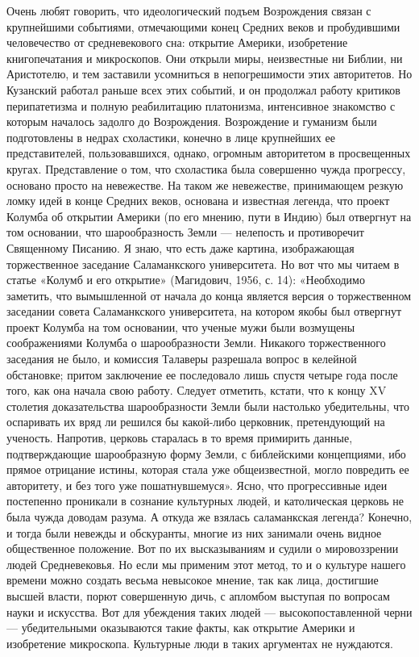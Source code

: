 Очень любят  говорить, что идеологический подъем  Возрождения связан с
крупнейшими событиями, отмечающими конец  Средних веков и пробудившими
человечество  от  средневекового  сна: открытие  Америки,  изобретение
книгопечатания и микроскопов. Они открыли миры, неизвестные ни Библии,
ни  Аристотелю,  и  тем  заставили усомниться  в  непогрешимости  этих
авторитетов.  Но  Кузанский  работал   раньше  всех  этих  событий,  и
он  продолжал  работу  критиков перипатетизма  и  полную  реабилитацию
платонизма,   интенсивное  знакомство   с  которым   началось  задолго
до   Возрождения.  Возрождение   и   гуманизм   были  подготовлены   в
недрах  схоластики,  конечно  в  лице  крупнейших  ее  представителей,
пользовавшихся,  однако, огромным  авторитетом в  просвещенных кругах.
Представление о  том, что схоластика была  совершенно чужда прогрессу,
основано  просто на  невежестве. На  таком же  невежестве, принимающем
резкую ломку идей в конце Средних веков, основана и известная легенда,
что проект Колумба  об открытии Америки (по его мнению,  пути в Индию)
был отвергнут на том основании, что шарообразность Земли --- нелепость
и  противоречит Священному  Писанию. Я  знаю, что  есть даже  картина,
изображающая  торжественное заседание  Саламанкского университета.  Но
вот  что  мы читаем  в  статье  «Колумб  и его  открытие»  (Магидович,
1956,  с. 14):  «Необходимо  заметить, что  вымышленной  от начала  до
конца является  версия о торжественном заседании  совета Саламанкского
университета, на  котором якобы  был отвергнут  проект Колумба  на том
основании,  что ученые  мужи  были возмущены  соображениями Колумба  о
шарообразности  Земли. Никакого  торжественного заседания  не было,  и
комиссия  Талаверы  разрешала  вопрос в  келейной  обстановке;  притом
заключение ее последовало лишь спустя  четыре года после того, как она
начала свою работу. Следует отметить,  кстати, что к концу XV столетия
доказательства  шарообразности Земли  были настолько  убедительны, что
оспаривать их вряд ли решился бы какой-либо церковник, претендующий на
ученость.  Напротив, церковь  старалась в  то время  примирить данные,
подтверждающие  шарообразную форму  Земли, с  библейскими концепциями,
ибо прямое  отрицание истины,  которая стала уже  общеизвестной, могло
повредить ее  авторитету, и  без того  уже пошатнувшемуся».  Ясно, что
прогрессивные идеи постепенно проникали в сознание культурных людей, и
католическая церковь не была чужда доводам разума. А откуда же взялась
саламанкская  легенда? Конечно,  и  тогда были  невежды и  обскуранты,
многие из них занимали очень  видное общественное положение. Вот по их
высказываниям и судили о мировоззрении людей Средневековья. Но если мы
применим  этот метод,  то и  о культуре  нашего времени  можно создать
весьма  невысокое  мнение,  так  как лица,  достигшие  высшей  власти,
порют  совершенную  дичь, с  апломбом  выступая  по вопросам  науки  и
искусства. Вот для убеждения  таких людей --- высокопоставленной черни
---  убедительными  оказываются  такие  факты,  как  открытие  Америки
и  изобретение  микроскопа.  Культурные  люди в  таких  аргументах  не
нуждаются.

